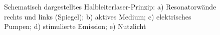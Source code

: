\begin{figure}[h]
	\centering
	\caption[Halbleiterlaser Prinzip]{Schematisch dargestelltes
	Halbleiterlaser-Prinzip: a)
	Resonatorwände rechts und links (Spiegel); b) aktives
	Medium; c) elektrisches Pumpen; d)
	stimulierte Emission; e) Nutzlicht}\label{fig:halbleiterlaser-prinzip}
\end{figure}

